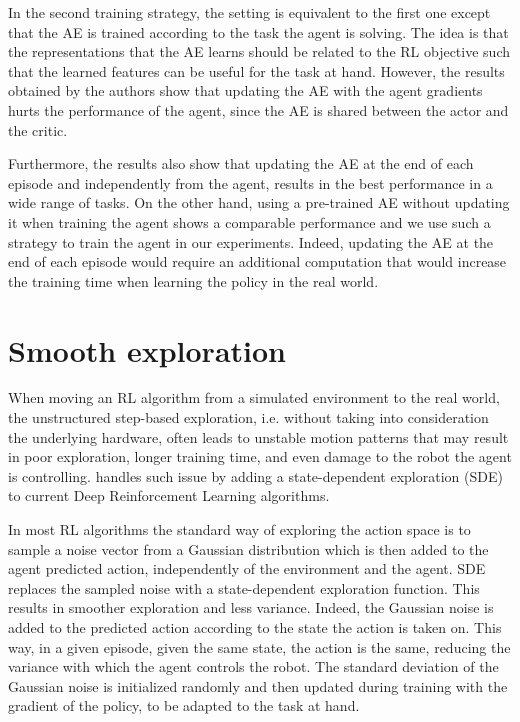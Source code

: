 In the second training strategy, the setting is equivalent to the first one except that the AE is trained according to the task the agent is solving. The idea is that the representations that the AE learns should be related to the RL objective such that the learned features can be useful for the task at hand. However, the results obtained by the authors show that updating the AE with the agent gradients hurts the performance of the agent, since the AE is shared between the actor and the critic.

Furthermore, the results also show that updating the AE at the end of each episode and independently from the agent, results in the best performance in a wide range of tasks. On the other hand, using a pre-trained AE without updating it when training the agent shows a comparable performance and we use such a strategy to train the agent in our experiments. Indeed, updating the AE at the end of each episode would require an additional computation that would increase the training time when learning the policy in the real world.

\section{Smooth exploration}
When moving an RL algorithm from a simulated environment to the real world, the unstructured step-based exploration, i.e. without taking into consideration the underlying hardware, often leads to unstable motion patterns that may result in poor exploration, longer training time, and even damage to the robot the agent is controlling. \citet{pmlr-v164-raffin22a} handles such issue by adding a state-dependent exploration (SDE) to current Deep Reinforcement Learning algorithms. 

In most RL algorithms the standard way of exploring the action space is to sample a noise vector from a Gaussian distribution which is then added to the agent predicted action, independently of the environment and the agent. SDE replaces the sampled noise with a state-dependent exploration function. This results in smoother exploration and less variance. Indeed, the Gaussian noise is added to the predicted action according to the state the action is taken on. This way, in a given episode, given the same state, the action is the same, reducing the variance with which the agent controls the robot. The standard deviation of the Gaussian noise is initialized randomly and then updated during training with the gradient of the policy, to be adapted to the task at hand.

